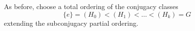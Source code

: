 \documentclass[11pt]{amsart}
\theoremstyle{definition}
\numberwithin{equation}{section}
\numberwithin{figure}{section}
\newcommand{\Map}{\textup{Map}}
\newcommand{\mc}{\mathcal}
\newcommand{\Man}{\mc M^\mathrm{Emb}}
\newcommand{\CMan}{\mc M^\mathrm{CEmb}}
\newcommand{\sbt}{\,\begin{picture}(-1,1)(0.5,-1)\circle*{1.8}\end{picture}\hspace{.05cm}}
\begin{document}
% 	
% 


As before, choose a total ordering of the conjugacy classes $$ \{e\} =(H_0) < (H_1) < \ldots < (H_k) = G$$ extending the subconjugacy partial ordering.
	
\end{document}

